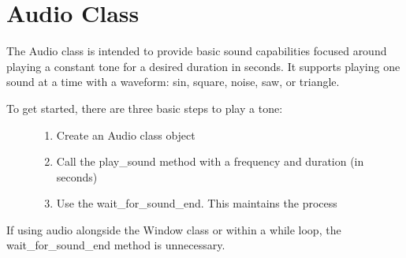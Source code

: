 \documentclass[letterpaper,10pt,english]{sphinxmanual}
\begin{document}
\chapter{Audio Class}
\label{\detokenize{fundamentals:audio-class}}
\sphinxAtStartPar
The Audio class is intended to provide basic sound capabilities focused around playing a constant tone for a desired duration in seconds. It supports playing one sound at a time with a waveform: sin, square, noise, saw, or triangle.
\begin{description}
\item[{To get started, there are three basic steps to play a tone:}] \leavevmode\begin{enumerate}
%
\item {} 
\sphinxAtStartPar
Create an Audio class object

\item {} 
\sphinxAtStartPar
Call the play\_sound method with a frequency and duration (in seconds)

\item {} 
\sphinxAtStartPar
Use the wait\_for\_sound\_end. This maintains the process

\end{enumerate}

\end{description}
\def\sphinxLiteralBlockLabel{\label{\detokenize{fundamentals:id2}}}
\begin{sphinxVerbatim}[commandchars=\\\{\}]
   
   
   

  
\end{sphinxVerbatim}

\sphinxAtStartPar
If using audio alongside the Window class or within a while loop, the wait\_for\_sound\_end method is unnecessary.
\def\sphinxLiteralBlockLabel{\label{\detokenize{fundamentals:id3}}}
\begin{sphinxVerbatim}[commandchars=\\\{\}]
   
   
   

  
      
\end{sphinxVerbatim}
\end{document}
